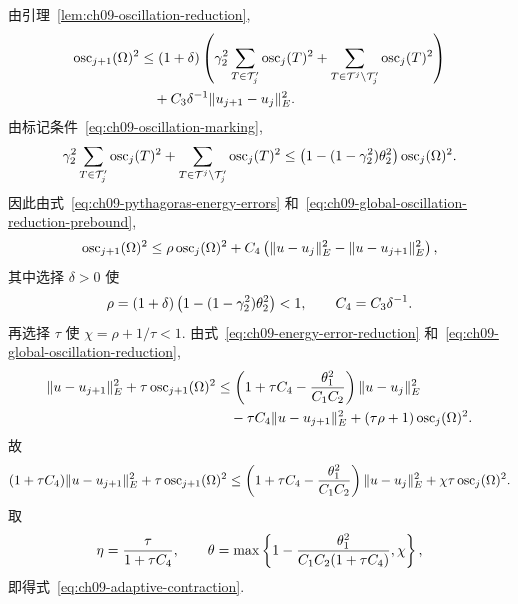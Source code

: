 \begin{Proof}
由引理~\ref{lem:ch09-oscillation-reduction},
\begin{align}
\MathBookFormulaID{formula-ch09-global-oscillation-reduction-prebound}
\label{eq:ch09-global-oscillation-reduction-prebound}
\operatorname{osc}_{j+1}(\Omega)^2
&\leq(1+\delta)\left(
\gamma_2^2\sum_{T\in\mathcal T_j'}\operatorname{osc}_j(T)^2
+\sum_{T\in\mathcal T^j\setminus\mathcal T_j'}\operatorname{osc}_j(T)^2\right)\notag\\
&\quad+C_3\delta^{-1}\|u_{j+1}-u_j\|_E^2.
\end{align}
由标记条件~\eqref{eq:ch09-oscillation-marking},
\[
\MathBookFormulaID{formula-ch09-marked-oscillation-fraction}
\gamma_2^2\sum_{T\in\mathcal T_j'}\operatorname{osc}_j(T)^2
+\sum_{T\in\mathcal T^j\setminus\mathcal T_j'}\operatorname{osc}_j(T)^2
\leq\left(1-(1-\gamma_2^2)\theta_2^2\right)\operatorname{osc}_j(\Omega)^2.
\]
因此由式~\eqref{eq:ch09-pythagoras-energy-errors} 和~\eqref{eq:ch09-global-oscillation-reduction-prebound},
\begin{equation}
\MathBookFormulaID{formula-ch09-global-oscillation-reduction}
\label{eq:ch09-global-oscillation-reduction}
\operatorname{osc}_{j+1}(\Omega)^2
\leq\rho\operatorname{osc}_j(\Omega)^2
+C_4\left(\|u-u_j\|_E^2-\|u-u_{j+1}\|_E^2\right),
\end{equation}
其中选择 $\delta>0$ 使
\[
\MathBookFormulaID{formula-ch09-oscillation-contraction-factor}
\rho=(1+\delta)\left(1-(1-\gamma_2^2)\theta_2^2\right)<1,
\qquad C_4=C_3\delta^{-1}.
\]
再选择 $\tau$ 使 $\chi=\rho+1/\tau<1$. 由式~\eqref{eq:ch09-energy-error-reduction} 和~\eqref{eq:ch09-global-oscillation-reduction},
\begin{align*}
\MathBookFormulaID{formula-ch09-combined-contraction-prebound}
\|u-u_{j+1}\|_E^2+\tau\operatorname{osc}_{j+1}(\Omega)^2
&\leq\left(1+\tau C_4-\frac{\theta_1^2}{C_1C_2}\right)\|u-u_j\|_E^2\\
&\quad-\tau C_4\|u-u_{j+1}\|_E^2
+(\tau\rho+1)\operatorname{osc}_j(\Omega)^2.
\end{align*}
故
\[
\MathBookFormulaID{formula-ch09-combined-contraction}
(1+\tau C_4)\|u-u_{j+1}\|_E^2
+\tau\operatorname{osc}_{j+1}(\Omega)^2
\leq\left(1+\tau C_4-\frac{\theta_1^2}{C_1C_2}\right)\|u-u_j\|_E^2
+\chi\tau\operatorname{osc}_j(\Omega)^2.
\]
取
\[
\MathBookFormulaID{formula-ch09-contraction-parameters}
\eta=\frac{\tau}{1+\tau C_4},
\qquad
\theta=\max\left\{1-\frac{\theta_1^2}{C_1C_2(1+\tau C_4)},\chi\right\},
\]
即得式~\eqref{eq:ch09-adaptive-contraction}.
\end{Proof}

